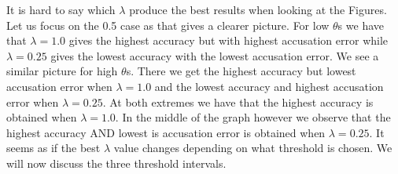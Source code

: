 \begin{description}
        It is hard to say which $\lambda$ produce the best results when looking
        at the Figures. Let us focus on the 0.5 case as that gives a clearer
        picture. For low $\theta$s we have that $\lambda = 1.0$ gives the
        highest accuracy but with highest accusation error while $\lambda =
        0.25$ gives the lowest accuracy with the lowest accusation error. We see
        a similar picture for high $\theta$s. There we get the highest accuracy
        but lowest accusation error when $\lambda = 1.0$ and the lowest accuracy
        and highest accusation error when $\lambda = 0.25$. At both extremes we
        have that the highest accuracy is obtained when $\lambda = 1.0$. In the
        middle of the graph however we observe that the highest accuracy AND
        lowest is accusation error is obtained when $\lambda = 0.25$. It seems
        as if the best $\lambda$ value changes depending on what threshold is
        chosen. We will now discuss the three threshold intervals.


\end{description}
